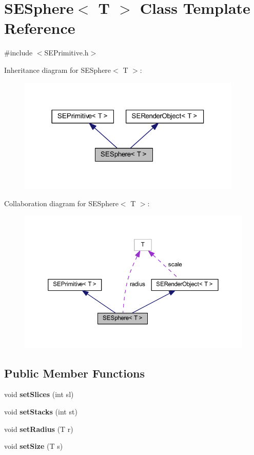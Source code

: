 \section{S\+E\+Sphere$<$ T $>$ Class Template Reference}
\label{class_s_e_sphere}


{\ttfamily \#include $<$S\+E\+Primitive.\+h$>$}



Inheritance diagram for S\+E\+Sphere$<$ T $>$\+:
\nopagebreak
\begin{figure}[H]
\begin{center}
\leavevmode
\includegraphics[width=302pt]{class_s_e_sphere__inherit__graph}
\end{center}
\end{figure}


Collaboration diagram for S\+E\+Sphere$<$ T $>$\+:
\nopagebreak
\begin{figure}[H]
\begin{center}
\leavevmode
\includegraphics[width=350pt]{class_s_e_sphere__coll__graph}
\end{center}
\end{figure}
\subsection*{Public Member Functions}
\begin{DoxyCompactItemize}
\item 
void {\bf set\+Slices} (int sl)
\item 
void {\bf set\+Stacks} (int st)
\item 
void {\bf set\+Radius} (T r)
\item 
void {\bf set\+Size} (T s)
\end{DoxyCompactItemize}
